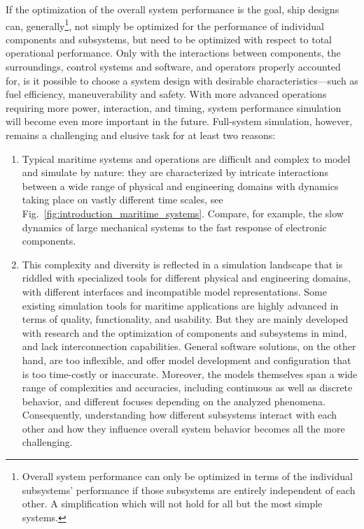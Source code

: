 \documentclass[prb,aps,showpacs,floatfix,twocolumn,10pt]{revtex4-1}
\theoremstyle{plain}
\theoremstyle{remark}
\begin{document}
If the optimization of the overall system performance is the goal, ship designs can, generally\footnote{%
Overall system performance can only be optimized in terms of the individual subsystems' performance if those subsystems are entirely independent of each other.
A simplification which will not hold for all but the most simple systems.
},
not simply be optimized for the performance of individual components and subsystems, but need to be optimized with respect to total operational performance.
Only with the interactions between components, the surroundings, control systems and software, and operators properly accounted for, is it possible to choose a system design with desirable characteristics---such as fuel efficiency, maneuverability and safety.
With more advanced operations requiring more power, interaction, and timing, system performance simulation will become even more important in the future.
Full-system simulation, however, remains a challenging and elusive task for at least two reasons:
\begin{enumerate}
	\item Typical maritime systems and operations are difficult and complex to model and simulate by nature:
	they are characterized by intricate interactions between a wide range of physical and engineering domains with dynamics taking place on vastly different time scales, see Fig.~\ref{fig:introduction_maritime_systems}.
	Compare, for example, the slow dynamics of large mechanical systems to the fast response of electronic components.
	\item This complexity and diversity is reflected in a simulation landscape that is riddled with specialized tools for different physical and engineering domains, with different interfaces and incompatible model representations.
Some existing simulation tools for maritime applications are highly advanced in terms of quality, functionality, and usability.
But they are mainly developed with research and the optimization of components and subsystems in mind, and lack interconnection capabilities.
General software solutions, on the other hand, are too inflexible, and offer model development and configuration that is too time-costly or inaccurate.
Moreover, the models themselves span a wide range of complexities and accuracies, including continuous as well as discrete behavior, and different focuses depending on the analyzed phenomena.
Consequently, understanding how different subsystems interact with each other and how they influence overall system behavior becomes all the more challenging.
\end{enumerate}
\end{document}
